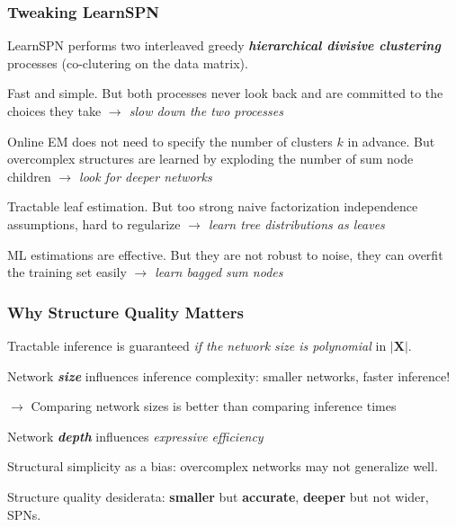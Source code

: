 \documentclass[10pt, t, xcolor={usenames,dvipsnames,svgnames}, compress]{beamer}
\begin{document}
\begin{frame}
  \frametitle{Tweaking LearnSPN}
  
  \textsf{LearnSPN} performs two interleaved greedy
  \textbf{\emph{hierarchical divisive clustering}}
  processes (co-clutering on the data matrix).\par\bigskip

  Fast and simple. But both processes never look back and are
  committed to the choices they take \emph{\color{gold2}$\rightarrow$ slow down the two
  processes}\par\bigskip

  Online EM does not need to specify the number of clusters $k$ in
  advance. But overcomplex structures are learned by exploding the number of sum
  node children \emph{\color{gold2}$\rightarrow$ look for deeper networks}\par\bigskip

  Tractable leaf estimation. But too strong naive factorization independence
  assumptions, hard to regularize \emph{\color{gold2}$\rightarrow$ learn tree
    distributions as leaves}\par\bigskip

  ML estimations are effective. But they are not robust to noise, they
  can overfit the training set easily
  \emph{\color{gold2}$\rightarrow$ learn bagged sum nodes}
\end{frame}

\begin{frame}
  \frametitle{Why Structure Quality Matters}

  Tractable inference is guaranteed \emph{if the network size is polynomial} in $|\mathbf{X}|$.\par\bigskip

  Network \emph{\textbf{size}} influences inference complexity: smaller networks,
  faster inference!\par
  $\rightarrow$ Comparing network sizes is better than comparing inference times\par\bigskip

  Network \emph{\textbf{depth}} influences \emph{expressive efficiency}~\parencite{Martens2014}~\parencite{Zhao2015}\par\bigskip

  Structural simplicity as a bias: overcomplex networks may not generalize well.\par\bigskip
  
  Structure quality desiderata: \textbf{\textbf{smaller}} but \textbf{\textbf{accurate}}, \textbf{deeper} but not
  wider, SPNs.
\end{frame}
\end{document}
